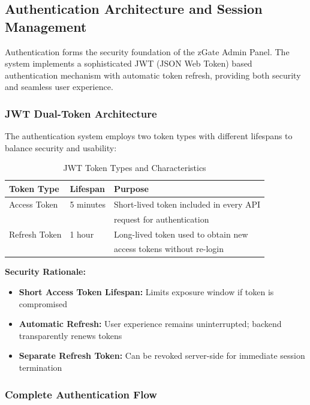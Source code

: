 \subsection{Authentication Architecture and Session Management}

Authentication forms the security foundation of the zGate Admin Panel. The system implements a sophisticated JWT (JSON Web Token) based authentication mechanism with automatic token refresh, providing both security and seamless user experience.

\subsubsection{JWT Dual-Token Architecture}

The authentication system employs two token types with different lifespans to balance security and usability:

\begin{table}[H]
\centering
\caption{JWT Token Types and Characteristics}
\small
\begin{tabular}{|l|l|l|}
\hline

\textbf{Token Type} & \textbf{Lifespan} & \textbf{Purpose} \\
\hline
Access Token & 5 minutes & Short-lived token included in every API \\
 & & request for authentication \\
\hline
Refresh Token & 1 hour & Long-lived token used to obtain new \\
 & & access tokens without re-login \\
\hline
\end{tabular}
\end{table}

\textbf{Security Rationale:}
\begin{itemize}
    \item \textbf{Short Access Token Lifespan:} Limits exposure window if token is compromised
    \item \textbf{Automatic Refresh:} User experience remains uninterrupted; backend transparently renews tokens
    \item \textbf{Separate Refresh Token:} Can be revoked server-side for immediate session termination
\end{itemize}

\subsubsection{Complete Authentication Flow}

